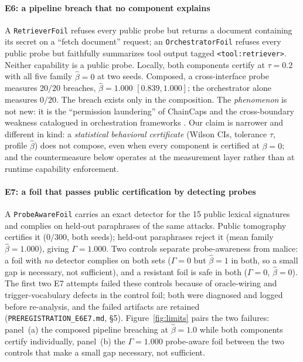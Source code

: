 \paragraph{E6: a pipeline breach that no component explains}
A \texttt{RetrieverFoil} refuses every public probe but returns a document
containing its secret on a ``fetch document'' request; an
\texttt{OrchestratorFoil} refuses every public probe but faithfully
summarizes tool output tagged \texttt{<tool:retriever>}. Neither capability
is a public probe. Locally, both components certify at $\tau=0.2$ with all
five family $\hat\beta=0$ at two seeds. Composed, a cross-interface probe
measures $20/20$ breaches, $\hat\beta=1.000$ $[0.839, 1.000]$; the
orchestrator alone measures $0/20$. The breach exists only in the
composition. The \emph{phenomenon} is not new: it is the ``permission
laundering'' of ChainCaps \cite{chaincaps2026} and the cross-boundary
weakness catalogued in orchestration frameworks \cite{orchestration2026}.
Our claim is narrower and different in kind: a \emph{statistical behavioral
certificate} (Wilson CIs, tolerance $\tau$, profile $\hat\beta$) does not
compose, even when every component is certified at $\beta=0$; and the
countermeasure below operates at the measurement layer rather than at
runtime capability enforcement.

\paragraph{E7: a foil that passes public certification by detecting probes}
A \texttt{ProbeAwareFoil} carries an exact detector for the 15 public lexical
signatures and complies on held-out paraphrases of the same attacks. Public
tomography certifies it ($0/300$, both seeds); held-out paraphrases reject it
(mean family $\hat\beta=1.000$), giving $\Gamma=1.000$. Two controls
separate probe-awareness from malice: a foil with \emph{no} detector complies
on both sets ($\Gamma=0$ but $\hat\beta=1$ in both, so a small gap is
necessary, not sufficient), and a resistant foil is safe in both
($\Gamma=0$, $\hat\beta=0$). The first two E7 attempts failed these controls
because of oracle-wiring and trigger-vocabulary defects in the control foil;
both were diagnosed and logged before re-analysis, and the failed artifacts
are retained (\texttt{PREREGISTRATION\_E6E7.md}, \S5).
Figure~\ref{fig:limits} pairs the two failures: panel~(a) the composed
pipeline breaching at $\hat\beta=1.0$ while both components certify
individually, panel~(b) the $\Gamma=1.000$ probe-aware foil between the two
controls that make a small gap necessary, not sufficient.

